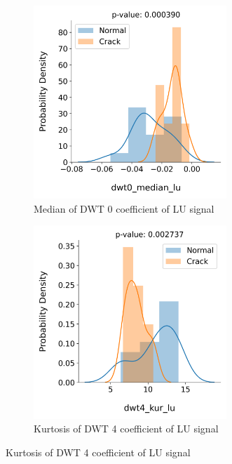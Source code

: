 \begin{figure}[tb]
  \begin{subfigure}[t]{0.49\linewidth}
    \centering
    \includegraphics[width=0.8\textwidth]{fig/crack_detection_dwt0_median_lu.png}
    \caption{Median of DWT 0 coefficient of LU signal}
  \end{subfigure}
  \begin{subfigure}[t]{0.49\linewidth}
    \centering
    \includegraphics[width=0.8\textwidth]{fig/crack_detection_dwt4_kur_lu.png}
    \caption{Kurtosis of DWT 4 coefficient of LU signal}
  \end{subfigure}

\end{figure}
